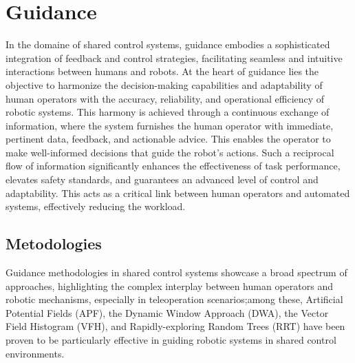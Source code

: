 \section{Guidance}
In the domaine of shared control systems, guidance embodies a sophisticated integration of feedback and control strategies, facilitating seamless and intuitive interactions between humans and robots.
At the heart of guidance lies the objective to harmonize the decision-making capabilities and adaptability of human operators with the accuracy, reliability, and operational efficiency of robotic systems. 
This harmony is achieved through a continuous exchange of information, where the system furnishes the human operator with immediate, pertinent data, feedback, and actionable advice. 
This enables the operator to make well-informed decisions that guide the robot's actions. Such a reciprocal flow of information significantly enhances the effectiveness of task performance, elevates safety standards, and guarantees an advanced level of control and adaptability.
This acts as a critical link between human operators and automated systems, effectively reducing the workload.%
\subsection{Metodologies}

Guidance methodologies in shared control systems showcase a broad spectrum of approaches, highlighting the complex interplay between human operators and robotic mechanisms, especially in teleoperation scenarios;among these, Artificial Potential Fields (APF), the Dynamic Window Approach (DWA), the Vector Field Histogram (VFH), and Rapidly-exploring Random Trees (RRT) have been proven to be particularly effective in guiding robotic systems in shared control environments.\\

